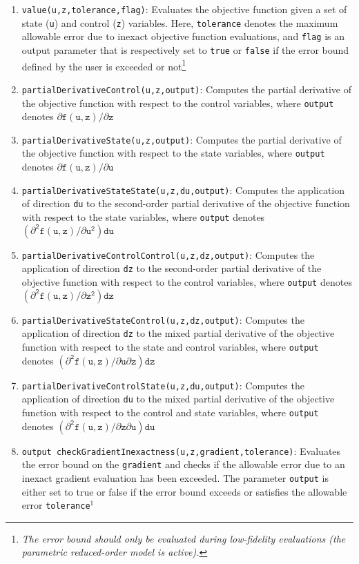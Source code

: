     \begin{enumerate}
    \item \texttt{value(u,z,tolerance,flag)}: Evaluates the objective function given a set of state (\texttt{u}) and control (\texttt{z}) variables. Here, \texttt{tolerance} denotes the maximum allowable error due to inexact objective function evaluations, and \texttt{flag} is an output parameter that is respectively set to \texttt{true} or \texttt{false} if the error bound defined by the user is exceeded or not\footnote{\emph{The error bound should only be evaluated during low-fidelity evaluations (the parametric reduced-order model is active).}}
    \item \texttt{partialDerivativeControl(u,z,output)}: Computes the partial derivative of the objective function with respect to the control variables, where \texttt{output} denotes $\mathtt{\partial{f}(u,z)/\partial{z}}$ 
    \item \texttt{partialDerivativeState(u,z,output)}: Computes the partial derivative of the objective function with respect to the state variables, where \texttt{output} denotes $\mathtt{\partial{f}(u,z)/\partial{u}}$ 
     \item \texttt{partialDerivativeStateState(u,z,du,output)}: Computes the application of direction \texttt{du} to the second-order partial derivative of the objective function with respect to the state variables, where \texttt{output} denotes $\mathtt{(\partial^2{f}(u,z)/\partial{u}^2)du}$ 
     \item \texttt{partialDerivativeControlControl(u,z,dz,output)}: Computes the application of direction \texttt{dz} to the second-order partial derivative of the objective function with respect to the control variables, where \texttt{output} denotes $\mathtt{(\partial^2{f}(u,z)/\partial{z}^2)dz}$ 
     \item \texttt{partialDerivativeStateControl(u,z,dz,output)}: Computes the application of direction \texttt{dz} to the mixed partial derivative of the objective function with respect to the state and control variables, where \texttt{output} denotes $\mathtt{(\partial^2{f}(u,z)/\partial{u}\partial{z})dz}$ 
    \item \texttt{partialDerivativeControlState(u,z,du,output)}: Computes the application of direction \texttt{du} to the mixed partial derivative of the objective function with respect to the control and state variables, where \texttt{output} denotes $\mathtt{(\partial^2{f}(u,z)/\partial{z}\partial{u})du}$ 
    \item \texttt{output checkGradientInexactness(u,z,gradient,tolerance)}: Evaluates the error bound on the \texttt{gradient} and checks if the allowable error due to an inexact gradient evaluation has been exceeded. The parameter \texttt{output} is either set to true or false if the error bound exceeds or satisfies the allowable error \texttt{tolerance}$^1$

\end{enumerate}
